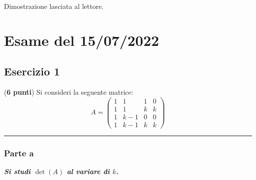 \documentclass[a4paper]{article}
\newcommand{\longline}{\noindent\rule{\textwidth}{0.4pt}}
\begin{document}
	\noindent
	Dimostrazione lasciata al lettore.\newpage

	\section{Esame del 15/07/2022}

	\subsection{Esercizio 1}

	(\textbf{6 punti}) Si consideri la seguente matrice:
	\begin{equation*}
		A = \begin{pmatrix}
			1 &	1	& 1 & 0 \\
			1 &	1	& k & k \\
			1 &	k-1	& 0 & 0 \\
			1 &	k-1	& k & k 
		\end{pmatrix}
	\end{equation*}
	
	\longline

	\subsubsection{Parte a}

	\textcolor{Green4}{\textbf{\emph{Si studi $\det\left(A\right)$ al variare di $k$.}}}\newline
\end{document}
